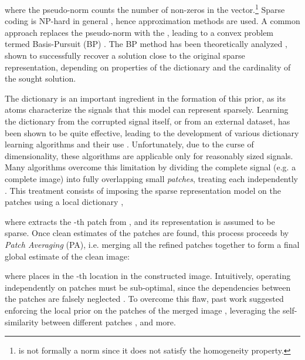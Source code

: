 \documentclass{article}
\begin{document}
where the  pseudo-norm counts the number of non-zeros in the vector.\footnote{ is not formally a norm since it does not satisfy the homogeneity property.}  Sparse coding is NP-hard in general \cite{natarajan1995sparse}, hence approximation methods are used. A common approach replaces the  pseudo-norm with the , leading to a convex problem termed Basis-Pursuit (BP) \cite{chen1994basis}. The BP method has been theoretically analyzed \cite{elad2010sparse}, shown to successfully recover a solution close to the original sparse representation, depending on properties of the dictionary and the cardinality of the sought solution.



The dictionary is an important ingredient in the formation of this prior, as its atoms characterize the signals that this model can represent sparsely. Learning the dictionary from the corrupted signal itself, or from an external dataset, has been shown to be quite effective, leading to the development of various dictionary learning algorithms and their use \cite{engan1999method,aharon2006k, mairal2009online, tosic2011dictionary}. Unfortunately, due to the curse of dimensionality, these algorithms are applicable only for reasonably sized signals. Many algorithms overcome this limitation by dividing the complete signal (e.g. a complete image) into fully overlapping small \emph{patches}, treating each independently \cite{aharon2006k, mairal2009online, dabov2007image, zoran2011learning}. This treatment consists of imposing the sparse representation model on the patches using a local dictionary ,

where  extracts the -th patch from  , and its representation  is assumed to be sparse. Once clean estimates of the patches are found, this process proceeds by \emph{Patch Averaging} (PA), i.e. merging all the refined patches together to form a final global estimate of the clean image: 

where  places  in the -th location in the constructed image. Intuitively, operating independently on patches must be sub-optimal, since the dependencies between the patches are falsely neglected \cite{batenkov2017global}. To overcome this flaw, past work suggested enforcing the local prior on the patches of the merged image \cite{zoran2011learning,sulam2015expected}, leveraging the self-similarity between different patches \cite{mairal2009non}, and more.
\end{document}
